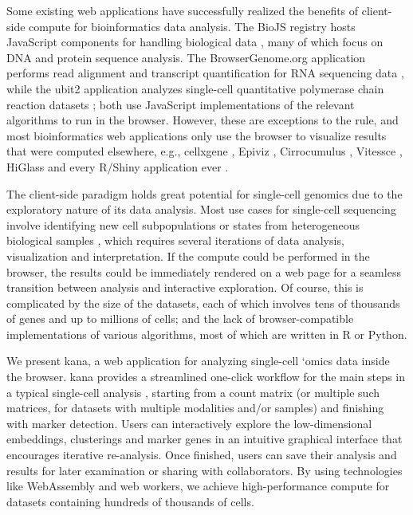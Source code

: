 \documentclass{article}
\begin{document}
Some existing web applications have successfully realized the benefits of client-side compute for bioinformatics data analysis.
The BioJS registry hosts JavaScript components for handling biological data \cite{gomez2013biojs}, many of which focus on DNA and protein sequence analysis.
The BrowserGenome.org application performs read alignment and transcript quantification for RNA sequencing data \cite{schmid2015browsergenome},
while the ubit2 application analyzes single-cell quantitative polymerase chain reaction datasets \cite{fan2017ubit2};
both use JavaScript implementations of the relevant algorithms to run in the browser.
However, these are exceptions to the rule, and most bioinformatics web applications only use the browser to visualize results that were computed elsewhere,
e.g., cellxgene \cite{megill2021cellxgene}, Epiviz \cite{chelaru2014epiviz}, Cirrocumulus \cite{cirrocumulus}, Vitessce \cite{vitessce}, HiGlass \cite{kerpedjiev2018higlass} and every R/Shiny application ever \cite{shiny}.

The client-side paradigm holds great potential for single-cell genomics due to the exploratory nature of its data analysis.
Most use cases for single-cell sequencing involve identifying new cell subpopulations or states from heterogeneous biological samples \cite{stegle2015computational},
which requires several iterations of data analysis, visualization and interpretation.
If the compute could be performed in the browser, the results could be immediately rendered on a web page for a seamless transition between analysis and interactive exploration.
Of course, this is complicated by the size of the datasets, each of which involves tens of thousands of genes and up to millions of cells;
and the lack of browser-compatible implementations of various algorithms, most of which are written in R or Python.

We present kana, a web application for analyzing single-cell `omics data inside the browser.
kana provides a streamlined one-click workflow for the main steps in a typical single-cell analysis \cite{amezquita2020orchestrating}, 
starting from a count matrix (or multiple such matrices, for datasets with multiple modalities and/or samples) and finishing with marker detection.
Users can interactively explore the low-dimensional embeddings, clusterings and marker genes in an intuitive graphical interface that encourages iterative re-analysis.
Once finished, users can save their analysis and results for later examination or sharing with collaborators.
By using technologies like WebAssembly and web workers, we achieve high-performance compute for datasets containing hundreds of thousands of cells.
\end{document}
